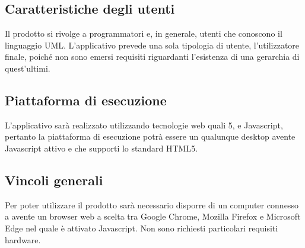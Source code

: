\documentclass[../AnalisiDeiRequisiti.tex]{subfiles}
\begin{document}
		\subsection{Caratteristiche degli utenti}
			Il prodotto si rivolge a programmatori e, in generale, utenti che conoscono
			il linguaggio UML. L'applicativo prevede una sola tipologia di utente,
			l'utilizzatore finale, poiché non sono emersi requisiti riguardanti
			l'esistenza di una gerarchia di quest'ultimi.
		\subsection{Piattaforma di esecuzione}
			L'applicativo sarà realizzato utilizzando tecnologie web quali 5,
			 e Javascript, pertanto la piattaforma di esecuzione potrà essere un
			qualunque  desktop avente Javascript attivo e che supporti lo standard HTML5.
		\subsection{Vincoli generali}
			Per poter utilizzare il prodotto sarà necessario disporre di un computer
			connesso a  avente un browser web a scelta tra Google Chrome, Mozilla Firefox e Microsoft Edge nel quale è attivato	Javascript. Non sono richiesti particolari requisiti hardware.
\end{document}
